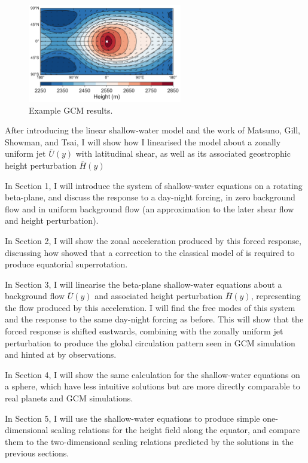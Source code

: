 \begin{figure}
  \centering
  \includegraphics[width=0.6\textwidth]{figures/wave-mean-flow/example-gcm-results.pdf}
  \caption{Example GCM results.}
  \label{fig:example-gcm-results}
\end{figure}

After introducing the linear shallow-water model and the work of Matsuno, Gill, Showman, and Tsai, I will show how I linearised the model about a zonally uniform jet $\bar{U}(y)$ with latitudinal shear, as well as its associated geostrophic height perturbation $\bar{H}(y)$

In Section 1, I will introduce the system of shallow-water equations on a rotating beta-plane, and discuss the response to a day-night forcing, in zero background flow and in uniform background flow (an approximation to the later shear flow and height perturbation).

In Section 2, I will show the zonal acceleration produced by this forced response, discussing how \citet{showman2010superrotation} showed that a correction to the classical model of \citet{matsuno1966quasi} is required to produce equatorial superrotation.

In Section 3, I will linearise the beta-plane shallow-water equations about a background flow $\bar{U}(y)$ and associated height perturbation $\bar{H}(y)$, representing the flow produced by this acceleration. I will find the free modes of this system and the response to the same day-night forcing as before. This will show that the forced response is shifted eastwards, combining with the zonally uniform jet perturbation to produce the global circulation pattern seen in GCM simulation and hinted at by observations.

In Section 4, I will show the same calculation for the shallow-water equations on a sphere, which have less intuitive solutions but are more directly comparable to real planets and GCM simulations.

In Section 5, I will use the shallow-water equations to produce simple one-dimensional scaling relations for the height field along the equator, and compare them to the two-dimensional scaling relations predicted by the solutions in the previous sections.


